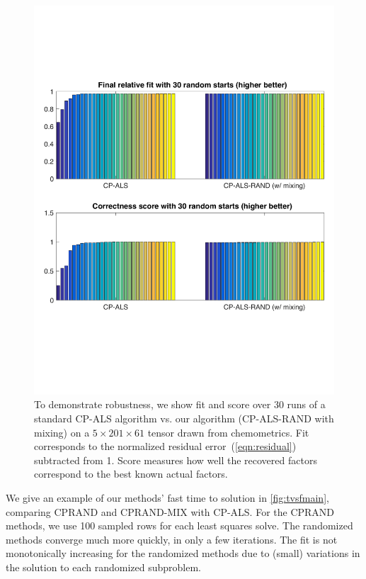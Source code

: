 \begin{figure}[h]
  \centering 
  \includegraphics[width=0.7\linewidth]{figs/tammyexperiment}
  \caption{To demonstrate robustness, we show fit and score over 30 runs of a standard CP-ALS algorithm vs. our algorithm (CP-ALS-RAND with mixing) on a $5 \times 201 \times 61$ tensor drawn from chemometrics. Fit corresponds to the normalized residual error~(\cref{eqn:residual}) subtracted from 1. Score measures how well the recovered factors correspond to the best known actual factors.}
  \label{fig:tammyexperiment}
\end{figure}
We give an example of our methods' fast time to solution in \cref{fig:tvsfmain},
comparing CPRAND and CPRAND-MIX with CP-ALS.
For the CPRAND methods, we use 100 sampled rows for each least squares solve.
The randomized methods converge much more quickly, in only a few
iterations. 
The fit is not monotonically increasing for the randomized methods due
to (small) variations in the solution to each randomized subproblem.
